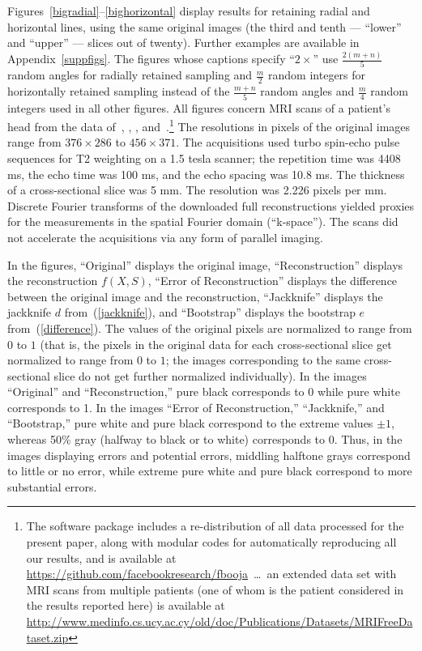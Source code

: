 \documentclass[article]{jdssv}
\begin{document}
Figures~\ref{bigradial}--\ref{bighorizontal} display results for retaining
radial and horizontal lines, using the same original images
(the third and tenth --- ``lower'' and ``upper'' --- slices out of twenty).
Further examples are available in Appendix~\ref{suppfigs}.
The figures whose captions specify ``$2\times$'' use
$\frac{2(m + n)}{5}$ random angles for radially retained sampling
and $\frac{m}{2}$ random integers for horizontally retained sampling
instead of the $\frac{m + n}{5}$ random angles
and $\frac{m}{4}$ random integers used in all other figures.
All figures concern MRI scans of a patient's head from the data
of~\citet{mri2}, \citet{mri1}, \citet{mri3},
and~\citet{mri4}.\footnote{The  software package 
includes a re-distribution of all data processed for the present paper,
along with modular codes for automatically reproducing all our results,
and is available at \url{https://github.com/facebookresearch/fbooja}\ \dots\ 
an extended data set with MRI scans from multiple patients (one of whom
is the patient considered in the results reported here) is available at
\url{http://www.medinfo.cs.ucy.ac.cy/old/doc/Publications/Datasets/MRIFreeDataset.zip}}
The resolutions in pixels of the original images range
from $376 \times 286$ to $456 \times 371$.
The acquisitions used turbo spin-echo pulse sequences for T2 weighting
on a 1.5 tesla scanner; the repetition time was 4408 ms,
the echo time was 100 ms, and the echo spacing was 10.8 ms.
The thickness of a cross-sectional slice was 5 mm.
The resolution was 2.226 pixels per mm.
Discrete Fourier transforms of the downloaded full reconstructions
yielded proxies for the measurements in the spatial Fourier domain
(``k-space'').
The scans did not accelerate the acquisitions via any form of parallel imaging.

In the figures,
``Original'' displays the original image,
``Reconstruction'' displays the reconstruction $f(X, S)$,
``Error of Reconstruction'' displays the difference between the original image
and the reconstruction,
``Jackknife'' displays the jackknife $d$ from~(\ref{jackknife}),
and ``Bootstrap'' displays the bootstrap $e$ from~(\ref{difference}).
The values of the original pixels are normalized to range from $0$ to $1$
(that is, the pixels in the original data for each cross-sectional slice
get normalized to range from $0$ to $1$; the images corresponding
to the same cross-sectional slice do not get further normalized individually).
In the images ``Original'' and ``Reconstruction,''
pure black corresponds to 0 while pure white corresponds to 1.
In the images ``Error of Reconstruction,'' ``Jackknife,'' and ``Bootstrap,''
pure white and pure black correspond to the extreme values $\pm 1$,
whereas 50\% gray (halfway to black or to white) corresponds to 0.
Thus, in the images displaying errors and potential errors,
middling halftone grays correspond to little or no error, while
extreme pure white and pure black correspond to more substantial errors.
\end{document}
